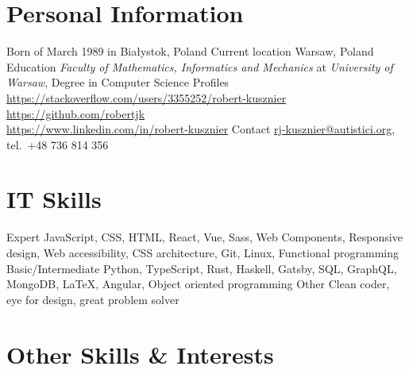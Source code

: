 

\section{Personal Information}

\begin{sectionlist}
    \sectionlistitem
        {Born}
        { of March 1989 in Bia\l{}ystok, Poland}
    \sectionlistitem
        {Current location}
        {Warsaw, Poland}
    \sectionlistitem
        {Education}
        {
            \emph{Faculty of Mathematics, Informatics and Mechanics} at
            \emph{University of Warsaw}, Degree in Computer
            Science
        }
    \sectionlistitem
        {Profiles}
        {
            \url{https://stackoverflow.com/users/3355252/robert-kusznier} \\
            \url{https://github.com/robertjk} \\
            \url{https://www.linkedin.com/in/robert-kusznier}
        }
    \sectionlistitem
        {Contact}
        {
            \href{mailto:rj-kusznier@autistici.org}{rj-kusznier@autistici.org},
            tel.~+48 736 814 356
        }
\end{sectionlist}


\section{IT Skills}

\begin{sectionlist}
    \sectionlistitem
        {Expert}
        {
            JavaScript, CSS, HTML, React, Vue, Sass, Web Components, Responsive
            design, Web accessibility, CSS architecture, Git, Linux, Functional
            programming
        }
    \sectionlistitem
        {Basic/Intermediate}
        {
            Python, TypeScript, Rust, Haskell, Gatsby, SQL, GraphQL, MongoDB, \LaTeX,
            Angular, Object oriented programming
        }
    \sectionlistitem
        {Other}
        {Clean coder, eye for design, great problem solver}
\end{sectionlist}


\section{Other Skills \& Interests}

